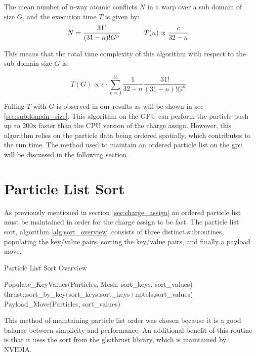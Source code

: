 The mean number of n-way atomic conflicts $N$ in a warp over a sub domain of size $G$, and the execution time $T$ is given by:
\begin{equation}
N = \frac{31!}{(31-n)! G^n} \hspace{0.1\textwidth} T(n) \propto \frac{c}{32-n}
\end{equation}

This means that the total time complexity of this algorithm with respect to the sub domain size $G$ is:

\begin{equation}
T(G) \propto c \cdot \sum_{n=1}^{31} \frac{1}{32-n} \frac{31!}{(31-n)! G^n}
\end{equation}

Falling $T$ with $G$ is observed in our results as will be shown in sec \ref{sec:subdomain_size}. This algorithm on the GPU can perform the particle push up to 200x faster than the CPU version of the charge assign. However, this algorithm relies on the particle data being ordered spatially, which contributes to the run time. The method used to maintain an ordered particle list on the gpu will be discussed in the following section.


	\section{Particle List Sort}
	\label{sec:plist_sort}
	
	As previously mentioned in section \ref{sec:charge_assign} an ordered particle list must be maintained in order for the charge assign to be fast. The particle list sort, algorithm \ref{alg:sort_overview} consists of three distinct subroutines, populating the key/value pairs, sorting the key/value pairs, and finally a payload move. 

\begin{algorithm}
	\caption{Particle List Sort Overview}
	\label{alg:sort_overview}
	\begin{algorithmic}
		\STATE
		\STATE Populate\_KeyValues(Particles, Mesh, sort\_keys, sort\_values)
		\STATE
		\STATE thrust::sort\_by\_key(sort\_keys,sort\_keys+nptcls,sort\_values)
		\STATE
		\STATE Payload\_Move(Particles, sort\_values)
	\end{algorithmic}
\end{algorithm}

This method of maintaining particle list order was chosen because it is a good balance between simplicity and performance. An additional benefit of this routine is that it uses the sort from the \gls{gls:thrust} library, which is maintained by NVIDIA. 

